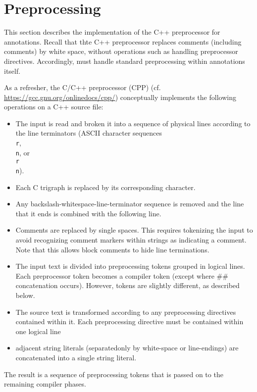 \chapter{Preprocessing}

This section describes the implementation of the C++ preprocessor for \acslpp
annotations. Recall that thte C++ preprocessor replaces comments (including
\acslpp comments) by white space, without operations such as handling
preprocessor directives. Accordingly, \fclang must handle standard
preprocessing within \acslpp annotations itself.

As a refresher, the C/C++ preprocessor (CPP) (cf. \url{https://gcc.gnu.org/onlinedocs/cpp/}) conceptually implements the following operations on a C++ source file:
\begin{itemize}
	\item The input is read and broken it into a sequence of physical lines according to the line terminators (ASCII character sequences \texttt{\\r}, \texttt{\\n}, or \texttt{\\r\\n}).
	\item Each C trigraph is replaced by its corresponding character.
	\item Any backslash-whitespace-line-terminator sequence is removed and the line that it ends is combined with the following line.
	\item Comments are replaced by single spaces. This requires tokenizing the input to avoid recognizing comment markers within strings as indicating a comment. Note that this allows block comments to hide line terminations.
	\item The input text is divided into preprocessing tokens grouped in logical lines. Each preprocessor token becomes a compiler token (except where \#\# concatenation occurs). However, \acslb tokens are slightly different, as described below.
	\item The source text is transformed according to any preprocessing directives contained within it. Each preprocessing directive must be contained within one logical line
    \item adjacent string literals (separatedonly by white-space or line-endings) are concatenated into a single string literal.
	
\end{itemize}
The result is a sequence of preprocessing tokens that is passed on to the 
remaining compiler phases.

